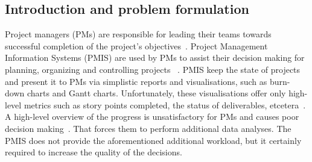 \documentclass[a4paper, 12pt]{article}
\begin{document}
\subsection{Introduction and problem formulation}


Project managers (PMs) are responsible for leading their teams towards successful completion of the project’s objectives~\cite{institute2017guide}. Project Management Information Systems (PMIS) are used by PMs to assist their decision making for planning, organizing and controlling projects ~\cite{CANIELS2012162}. PMIS keep the state of projects and present it to PMs via simplistic reports and visualisations, such as burn-down charts and Gantt charts. Unfortunately, these visualisations offer only high-level metrics such as story points completed, the status of deliverables, etcetera~\cite{institute2017guide}. A high-level overview of the progress is unsatisfactory for PMs and causes poor decision making~\cite{CANIELS2012162}. That forces them to perform additional data analyses. The PMIS does not provide the aforementioned additional workload, but it certainly required to increase the quality of the decisions.



\end{document}
